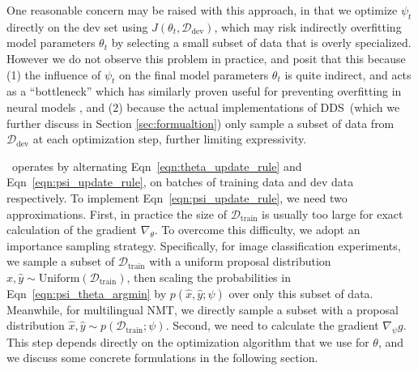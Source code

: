 One reasonable concern may be raised with this approach, in that we optimize $\psi_t$ directly on the dev set using $J(\theta_t, \mathcal{D}_\text{dev})$, which may risk indirectly overfitting model parameters $\theta_t$ by selecting a small subset of data that is overly specialized.
However we do not observe this problem in practice, and posit that this because (1) the influence of $\psi_t$ on the final model parameters $\theta_t$ is quite indirect, and acts as a ``bottleneck'' which has similarly proven useful for preventing overfitting in neural models \cite{grezl2007probabilistic}, and (2) because the actual implementations of DDS~(which we further discuss in Section \ref{sec:formualtion}) only sample a subset of data from $\mathcal{D}_\text{dev}$ at each optimization step, further limiting expressivity.

\dds~operates by alternating Eqn~\ref{eqn:theta_update_rule} and Eqn~\ref{eqn:psi_update_rule}, on batches of training data and dev data respectively. To implement Eqn~\ref{eqn:psi_update_rule}, we need two approximations.
First, in practice the size of $\mathcal{D}_\text{train}$ is usually too large for exact calculation of the gradient $\nabla_\theta$. To overcome this difficulty, we adopt an importance sampling strategy. Specifically, for image classification experiments, we sample a subset of $\mathcal{D}_{\text{train}}$ with a uniform proposal distribution $\hat{x}, \hat{y} \sim \text{Uniform}(\mathcal{D}_\text{train})$, then scaling the probabilities in Eqn~\ref{eqn:psi_theta_argmin} by $p(\hat{x}, \hat{y}; \psi)$ over only this subset of data. Meanwhile, for multilingual NMT, we directly sample a subset with a proposal distribution $\hat{x}, \hat{y} \sim p(\mathcal{D}_\text{train}; \psi)$. Second, we need to calculate the gradient $\nabla_\psi g$. This step depends directly on the optimization algorithm that we use for $\theta$, and we discuss some concrete formulations in the following section.

